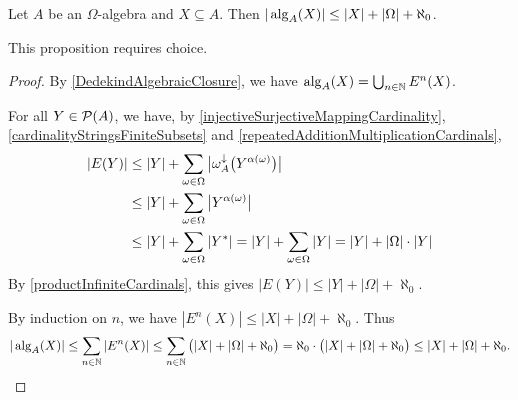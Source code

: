 \begin{proposition}
Let $A$ be an $\Omega$-algebra and $X\subseteq A$. Then $|\operatorname{alg}_A(X)| \leq |X| + |\Omega| + \aleph_0$.
\end{proposition}
This proposition requires choice.
\begin{proof}
By \ref{DedekindAlgebraicClosure}, we have $\operatorname{alg}_A(X) = \bigcup_{n\in\mathbb{N}}E^n(X)$.

For all $Y\in\operatorname{\mathcal{P}}(A)$, we have, by \ref{injectiveSurjectiveMappingCardinality}, \ref{cardinalityStringsFiniteSubsets} and \ref{repeatedAdditionMultiplicationCardinals},
\begin{align*}
|E(Y)| &\leq |Y| + \sum_{\omega\in\Omega}\big|\omega_A^\downarrow\big(Y^{\alpha(\omega)}\big)\big| \\
&\leq |Y| + \sum_{\omega\in\Omega}\big|Y^{\alpha(\omega)}\big| \\
&\leq |Y| + \sum_{\omega\in\Omega}|Y^{*}| = |Y| + \sum_{\omega\in\Omega}|Y| = |Y| + |\Omega|\cdot |Y|
\end{align*}
By \ref{productInfiniteCardinals}, this gives $|E(Y)| \leq |Y| + |\Omega| + \aleph_0$.

By induction on $n$, we have $|E^n(X)| \leq |X| + |\Omega| + \aleph_0$. Thus
\[ |\operatorname{alg}_A(X)| \leq \sum_{n\in\mathbb{N}}|E^n(X)| \leq \sum_{n\in\mathbb{N}}\big(|X| + |\Omega| + \aleph_0\big) = \aleph_0\cdot\big(|X| + |\Omega| + \aleph_0\big) \leq |X| + |\Omega| + \aleph_0. \]
\end{proof}

